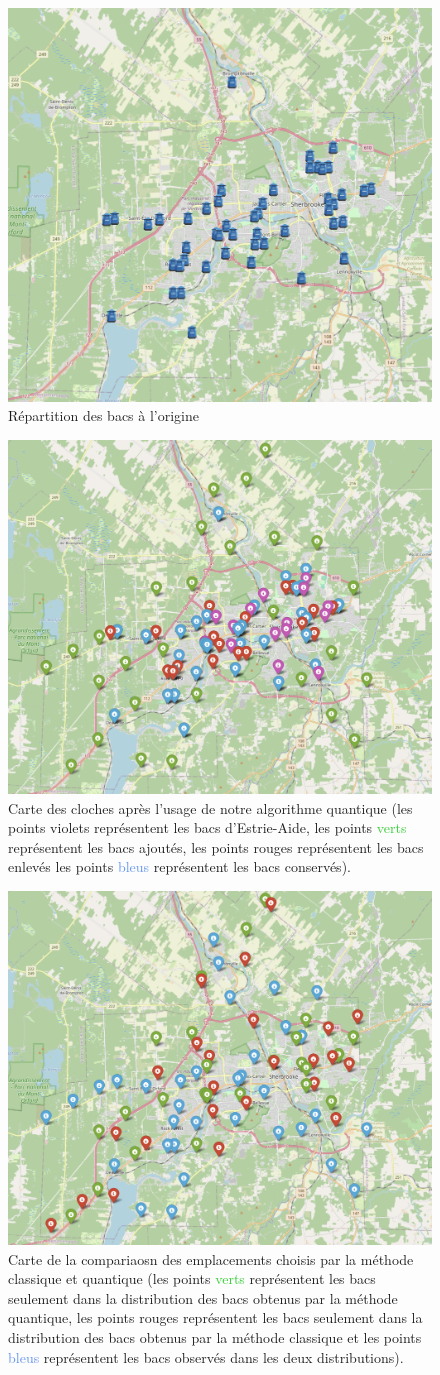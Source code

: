 \documentclass[11pt]{article}
\begin{document}
\begin{figure}[H]
    \centering
    \includegraphics[width=0.49\linewidth]{images/original.png}
    \caption{Répartition des bacs à l'origine}
    \label{original}
\end{figure}
\begin{figure}[H]
    \centering
    \includegraphics[width=0.49\linewidth]{images/total_quantum.png}
    \caption{Carte des cloches après l'usage de notre algorithme quantique (les points \textcolor{Mulberry}{violets} représentent les bacs d'Estrie-Aide, les points \textcolor{LimeGreen}{verts} représentent les bacs ajoutés, les points \textcolor{BrickRed}{rouges} représentent les bacs enlevés les points \textcolor{CornflowerBlue}{bleus} représentent les bacs conservés).
}
    \label{total}
\end{figure}

\begin{figure}[H]
    \centering
    \includegraphics[width=0.49\linewidth]{images/both_distributions.png}
    \caption{Carte de la compariaosn des emplacements choisis par la méthode classique et quantique (les points \textcolor{LimeGreen}{verts} représentent les bacs seulement dans la distribution des bacs obtenus par la méthode quantique, les points \textcolor{BrickRed}{rouges} représentent les bacs seulement dans la distribution des bacs obtenus par la méthode classique et les points \textcolor{CornflowerBlue}{bleus} représentent les bacs observés dans les deux distributions).
}
    \label{bothdist}
\end{figure}
\end{document}
